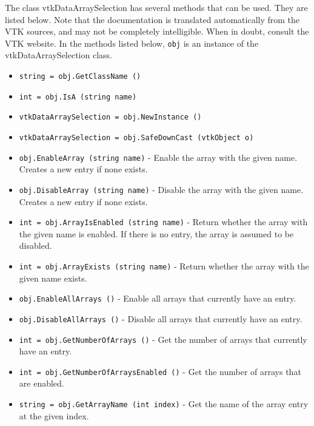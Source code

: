 The class vtkDataArraySelection has several methods that can be used.
  They are listed below.
Note that the documentation is translated automatically from the VTK sources,
and may not be completely intelligible.  When in doubt, consult the VTK website.
In the methods listed below, \verb|obj| is an instance of the vtkDataArraySelection class.
\begin{itemize}
\item  \verb|string = obj.GetClassName ()|

\item  \verb|int = obj.IsA (string name)|

\item  \verb|vtkDataArraySelection = obj.NewInstance ()|

\item  \verb|vtkDataArraySelection = obj.SafeDownCast (vtkObject o)|

\item  \verb|obj.EnableArray (string name)| -  Enable the array with the given name.  Creates a new entry if
 none exists.

\item  \verb|obj.DisableArray (string name)| -  Disable the array with the given name.  Creates a new entry if
 none exists.

\item  \verb|int = obj.ArrayIsEnabled (string name)| -  Return whether the array with the given name is enabled.  If
 there is no entry, the array is assumed to be disabled.

\item  \verb|int = obj.ArrayExists (string name)| -  Return whether the array with the given name exists.

\item  \verb|obj.EnableAllArrays ()| -  Enable all arrays that currently have an entry.

\item  \verb|obj.DisableAllArrays ()| -  Disable all arrays that currently have an entry.

\item  \verb|int = obj.GetNumberOfArrays ()| -  Get the number of arrays that currently have an entry.

\item  \verb|int = obj.GetNumberOfArraysEnabled ()| -  Get the number of arrays that are enabled.

\item  \verb|string = obj.GetArrayName (int index)| -  Get the name of the array entry at the given index.


\end{itemize}

